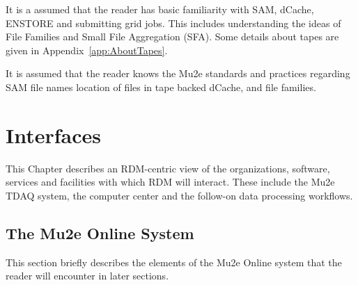 It is a assumed that the reader has basic familiarity with SAM, dCache, ENSTORE and submitting grid jobs.
This includes understanding the ideas of File Families and Small File Aggregation (SFA).
Some details about tapes are given in Appendix~\ref{app:AboutTapes}.

It is assumed that the reader knows the Mu2e standards and practices regarding SAM file names\cite{Mu2eSAM}
location of files in tape backed dCache\cite{FileNames}, and file families.


\chapter{Interfaces}
\label{ch:SelectedDetails}
This Chapter describes an RDM-centric view of the organizations, software, services and facilities
with which RDM will interact.  These include the Mu2e TDAQ system,
the computer center and the follow-on data processing workflows.

\section{The Mu2e Online System}
\label{sec:Mu2eOnlineSystem}

This section briefly describes the elements of the Mu2e Online system that the reader will encounter in later sections.

